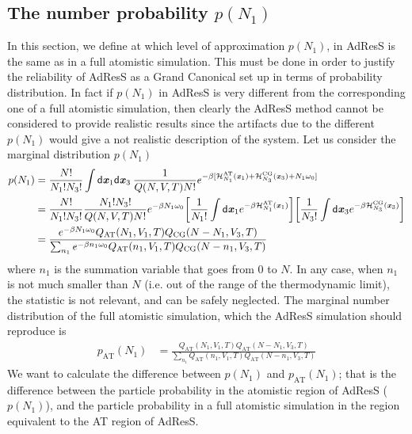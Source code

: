 \documentclass[aip,jcp,a4paper,reprint,onecolumn]{revtex4-1}
\newcommand{\vect}[1]{\textbf{\textit{#1}}}
\newcommand{\dd}[1]{\textsf{#1}}
\newcommand{\AT}{{\textrm{{AT}}}}
\newcommand{\CG}{{\textrm{CG}}}
\begin{document}
\subsection{The number probability $p(N_1)$}
In this section, we define at which level of approximation $p(N_{1})$, in AdResS is the same as in a full atomistic simulation. This must be done in order to justify the reliability of AdResS as a Grand Canonical set up in terms of probability distribution. In fact if  $p(N_{1})$ in AdResS is very different from the corresponding one of a full atomistic simulation, then clearly the AdResS method cannot be considered to provide realistic results since the artifacts due to the different $p(N_{1})$ would give a not realistic description of the system. 
Let us consider the marginal distribution $p(N_1)$
\begin{align}\nonumber
  p(N_1)
  &=
  \frac{N!}{N_1!N_3!}
  \int
  \dd d\vect x_1\dd d\vect x_3  \:
  \frac{1}{Q(N,V,T) N!}
  e^{-\beta
    [\mathcal H_{N_1}^{\AT}(\vect x_1) +
    \mathcal H_{N_3}^{\CG}(\vect x_3) +
    N_1\omega_0]}\\\nonumber
  &=
  \frac{N!}{N_1!N_3!}
  \frac{N_1!N_3!}{Q(N,V,T) N!}
  e^{-\beta N_1\omega_0}
  \bigg[
  \frac1{N_1!}
  \int
  \dd d\vect x_1
  e^{-\beta \mathcal H_{N_1}^{\AT}(\vect x_1)}
  \bigg]
  \bigg[
  \frac1{N_3!}
  \int
  \dd d\vect x_3
  e^{-\beta \mathcal H_{N_3}^{\CG}(\vect x_3)}
  \bigg]  \\\label{eqn:pn1}
  &=
  \frac
  {
    e^{-\beta N_1\omega_0}
    Q_{\AT}(N_1,V_1,T) Q_{\CG}(N-N_1,V_3,T)
  }
  {
    \sum_{n_1}
    e^{-\beta n_1\omega_0}
    Q_{\AT}(n_1,V_1,T) Q_{\CG}(N-n_1,V_3,T)
  }
\end{align}
where $n_1$ is the summation variable that goes from 0 to $N$.
In any case, when $n_1$ is not much smaller than $N$ (i.e. out of the range of the
thermodynamic limit), the statistic is not relevant,
and can be safely neglected.
The marginal number distribution of the full atomistic simulation,
which the AdResS simulation should
reproduce is
\begin{align}
  p_{\AT}(N_1)
  &=
  \frac
  {
    Q_{\AT}(N_1,V_1,T) Q_{\AT}(N-N_1,V_3,T)
  }
  {
    \sum_{n_1}
    Q_{\AT}(n_1,V_1,T) Q_{\AT}(N-n_1,V_3,T)
  }  
\end{align}
We want to calculate the difference between $p(N_1)$ and $p_{\AT}(N_1)$; that is the difference between the particle probability in the atomistic region of AdResS ($p(N_{1})$), and the particle probability in a full atomistic simulation in the region equivalent to the AT region of AdResS.
\end{document}
